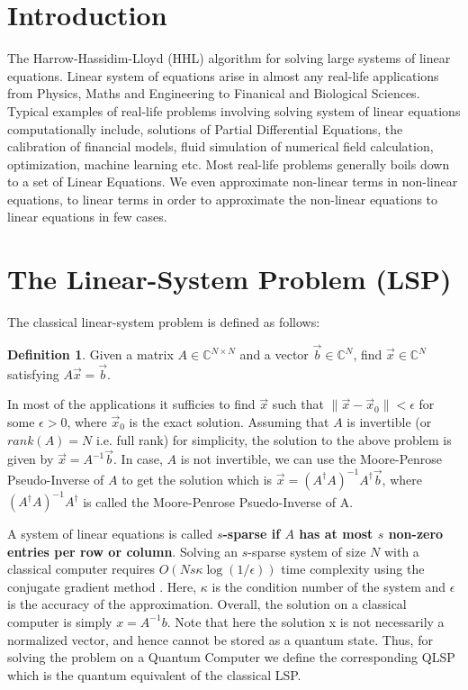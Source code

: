 \documentclass[12pt, oneside]{book}
\theoremstyle{definition}
\newtheorem{definition}{Definition}[section]
\theoremstyle{definition}
\theoremstyle{remark}
\begin{document}
\section{Introduction}
The Harrow-Hassidim-Lloyd (HHL) \cite{harrow2009quantum} 
algorithm for solving large systems of linear equations.
Linear system of equations arise in almost any real-life applications from Physics, Maths and Engineering
to Finanical and Biological Sciences. Typical examples of real-life problems involving solving system of linear equations computationally include, 
solutions of Partial Differential Equations, the calibration of financial models, fluid simulation 
of numerical field calculation, optimization, machine learning etc. 
Most real-life problems generally boils down to a set of Linear Equations. We even approximate 
non-linear terms in non-linear equations, to linear terms in order to approximate the non-linear equations to linear equations in few cases.

\section{The Linear-System Problem (LSP)}
The classical linear-system problem is defined as follows:
\begin{definition}
Given a matrix $A\in \mathbb{C}^{N \times N}$ and a vector $\vec{b} \in \mathbb{C}^N$, find $\vec{x} \in \mathbb{C}^N$
satisfying $A\vec{x}=\vec{b}$.
\end{definition}

In most of the applications it sufficies to find 
$\vec{x}$ such that $\|\vec{x}-\vec{x}_0\|<\epsilon$ for some $\epsilon>0$, 
where $\vec{x}_0$ is the exact solution.
Assuming that $A$ is invertible (or $rank(A)=N$ i.e. full rank)
for simplicity, the solution to the above problem is given by $\vec{x}=A^{-1}\vec{b}$.
In case, $A$ is not invertible, we can use the Moore-Penrose Pseudo-Inverse of $A$ to get the solution which is 
$\vec{x}=(A^{\dagger}A)^{-1}A^{\dagger}\vec{b}$, where $(A^{\dagger}A)^{-1}A^{\dagger}$ is called the Moore-Penrose Psuedo-Inverse of A.

A system of linear equations is called \textbf{$s$-sparse if $A$ has at most $s$ non-zero entries per row or column}. 
Solving an $s$-sparse system of size $N$ with a classical computer requires $O(Ns\kappa \log (1/\epsilon))$ time complexity
using the conjugate gradient method \cite{shewchuk1994introduction}. Here, $\kappa$ is the condition number of the system and 
$\epsilon$ is the accuracy of the approximation. Overall, the solution on a classical computer is simply $x=A^{-1}b$. Note that here the solution x is not necessarily a normalized vector, and hence cannot be stored as a quantum state. Thus, for solving the problem on a Quantum Computer we define the corresponding QLSP which is the quantum equivalent of the classical LSP.
\end{document}

